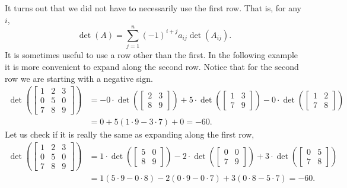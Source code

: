 It turns out that we did not have to necessarily use the first row.
That is, for any $i$,
\begin{equation*}
\det (A)
=
\sum_{j=1}^n
{(-1)}^{i+j}
a_{ij} \det (A_{ij}) .
\end{equation*}
It is sometimes useful to use a row other than the first.  In the following
example it is more convenient to expand along the second row.  Notice that for the
second row we are starting with a negative sign.
\begin{equation*}
\begin{split}
\det \left(
\begin{bmatrix}
1 & 2 & 3 \\
0 & 5 & 0 \\
7 & 8 & 9
\end{bmatrix}
\right)
& =
- 0 \cdot
\det \left(
\begin{bmatrix}
2 & 3 \\
8 & 9
\end{bmatrix}
\right)
+
5 \cdot
\det \left(
\begin{bmatrix}
1 & 3 \\
7 & 9
\end{bmatrix}
\right)
-
0 \cdot
\det \left(
\begin{bmatrix}
1 & 2 \\
7 & 8
\end{bmatrix}
\right) \\
& =
0
+
5 (1 \cdot 9 - 3 \cdot 7)
+
0
= -60 .
\end{split}
\end{equation*}
Let us check if it is really the same as expanding along the first row,
\begin{equation*}
\begin{split}
\det \left(
\begin{bmatrix}
1 & 2 & 3 \\
0 & 5 & 0 \\
7 & 8 & 9
\end{bmatrix}
\right)
& =
1 \cdot
\det \left(
\begin{bmatrix}
5 & 0 \\
8 & 9
\end{bmatrix}
\right)
-
2 \cdot
\det \left(
\begin{bmatrix}
0 & 0 \\
7 & 9
\end{bmatrix}
\right)
+
3 \cdot
\det \left(
\begin{bmatrix}
0 & 5 \\
7 & 8
\end{bmatrix}
\right) \\
& =
1 (5 \cdot 9 - 0 \cdot 8)
-
2 (0 \cdot 9 - 0 \cdot 7)
+
3 (0 \cdot 8 - 5 \cdot 7)
= -60 .
\end{split}
\end{equation*}



